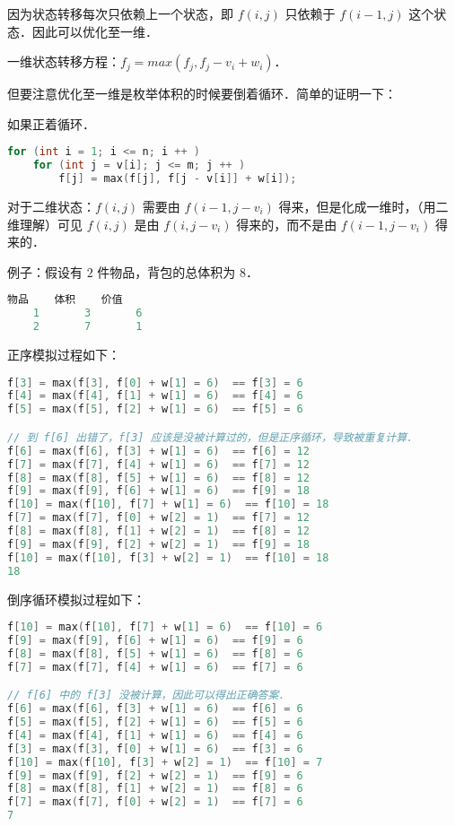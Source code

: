 因为状态转移每次只依赖上一个状态，即 $f(i, j)$ 只依赖于 $f(i - 1, j)$ 这个状态．因此可以优化至一维．

一维状态转移方程：$f_j = max(f_j, f_j - v_i + w_i)$．

但要注意优化至一维是枚举体积的时候要倒着循环．简单的证明一下：

如果正着循环．

\begin{lstlisting}[language=cpp]
for (int i = 1; i <= n; i ++ ) 
    for (int j = v[i]; j <= m; j ++ ) 
        f[j] = max(f[j], f[j - v[i]] + w[i]);
\end{lstlisting}

对于二维状态：$f(i, j)$ 需要由 $f(i - 1, j - v_i)$ 得来，但是化成一维时，（用二维理解）可见 $f(i, j)$ 是由 $f(i, j - v_i)$ 得来的，而不是由 $f(i - 1, j - v_i)$ 得来的．

例子：假设有 $2$ 件物品，背包的总体积为 $8$．

\begin{lstlisting}[language=cpp]
    物品    体积    价值
    1       3       6
    2       7       1
\end{lstlisting}

正序模拟过程如下：

\begin{lstlisting}[language=cpp]
f[3] = max(f[3], f[0] + w[1] = 6)  == f[3] = 6 
f[4] = max(f[4], f[1] + w[1] = 6)  == f[4] = 6 
f[5] = max(f[5], f[2] + w[1] = 6)  == f[5] = 6 

// 到 f[6] 出错了，f[3] 应该是没被计算过的，但是正序循环，导致被重复计算．
f[6] = max(f[6], f[3] + w[1] = 6)  == f[6] = 12
f[7] = max(f[7], f[4] + w[1] = 6)  == f[7] = 12 
f[8] = max(f[8], f[5] + w[1] = 6)  == f[8] = 12 
f[9] = max(f[9], f[6] + w[1] = 6)  == f[9] = 18 
f[10] = max(f[10], f[7] + w[1] = 6)  == f[10] = 18 
f[7] = max(f[7], f[0] + w[2] = 1)  == f[7] = 12 
f[8] = max(f[8], f[1] + w[2] = 1)  == f[8] = 12 
f[9] = max(f[9], f[2] + w[2] = 1)  == f[9] = 18 
f[10] = max(f[10], f[3] + w[2] = 1)  == f[10] = 18 
18
\end{lstlisting}

倒序循环模拟过程如下：

\begin{lstlisting}[language=cpp]
f[10] = max(f[10], f[7] + w[1] = 6)  == f[10] = 6 
f[9] = max(f[9], f[6] + w[1] = 6)  == f[9] = 6 
f[8] = max(f[8], f[5] + w[1] = 6)  == f[8] = 6 
f[7] = max(f[7], f[4] + w[1] = 6)  == f[7] = 6 

// f[6] 中的 f[3] 没被计算，因此可以得出正确答案．
f[6] = max(f[6], f[3] + w[1] = 6)  == f[6] = 6 
f[5] = max(f[5], f[2] + w[1] = 6)  == f[5] = 6 
f[4] = max(f[4], f[1] + w[1] = 6)  == f[4] = 6 
f[3] = max(f[3], f[0] + w[1] = 6)  == f[3] = 6 
f[10] = max(f[10], f[3] + w[2] = 1)  == f[10] = 7 
f[9] = max(f[9], f[2] + w[2] = 1)  == f[9] = 6 
f[8] = max(f[8], f[1] + w[2] = 1)  == f[8] = 6 
f[7] = max(f[7], f[0] + w[2] = 1)  == f[7] = 6 
7
\end{lstlisting}


